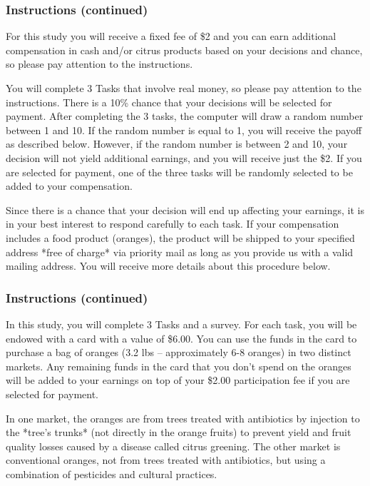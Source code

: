 \documentclass[12pt]{article}
\begin{document}
\subsubsection*{\textbf{Instructions (continued)}}


For this study you will receive a fixed fee of \$2 and you can earn additional compensation in cash and/or citrus products based on your decisions and chance, so please pay attention to the instructions.
 
You will complete 3 Tasks that involve real money, so please pay attention to the instructions. There is a 10\% chance that your decisions will be selected for payment. After completing the 3 tasks, the computer will draw a random number between 1 and 10. If the random number is equal to 1, you will receive the payoff as described below. However, if the random number is between 2 and 10, your decision will not yield additional earnings, and you will receive just the \$2. If you are selected for payment, one of the three tasks will be randomly selected to be added to your compensation.

 Since there is a chance that your decision will end up affecting your earnings, it is in your best interest to respond carefully to each task. If your compensation includes a food product (oranges), the product will be shipped to your specified address *free of charge* via priority mail as long as you provide us with a valid mailing address. You will receive more details about this procedure below.

\clearpage

\subsubsection*{\textbf{Instructions (continued)}}

In this study, you will complete 3 Tasks and a survey.
For each task, you will be endowed with a card with a value of \$6.00. You can use the funds in the card to purchase a bag of oranges (3.2 lbs – approximately 6-8 oranges) in two distinct markets. Any remaining funds in the card that you don’t spend on the oranges will be added to your earnings on top of your \$2.00 participation fee if you are selected for payment.



In one market, the oranges are from trees treated with antibiotics by injection to the *tree’s trunks* (not directly in the orange fruits) to prevent yield and fruit quality losses caused by a disease called citrus greening. The other market is conventional oranges, not from trees treated with antibiotics, but using a combination of pesticides and cultural practices.
\end{document}
